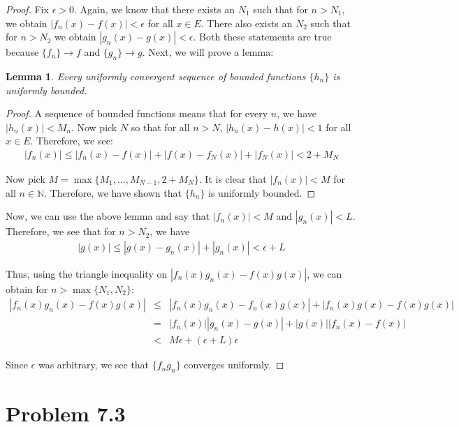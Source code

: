 \documentclass[psamsfonts]{amsart}
\newtheorem{lem}[thm]{Lemma}
\theoremstyle{definition}
\theoremstyle{remark}
\numberwithin{equation}{section}
\begin{document}
\begin{proof}
Fix $\epsilon > 0$. Again, we know that there exists an $N_1$ such that for $n > N_1$, we obtain $|f_n(x) - f(x)| < \epsilon$ for all $x \in E$. There also exists an $N_2$ such that for $n > N_2$ we obtain $|g_n(x) - g(x)| < \epsilon$. Both these statements are true because $\{ f_n \} \to f$ and $\{g_n \} \to g$. Next, we will prove a lemma:

\begin{lem}
Every uniformly convergent sequence of bounded functions $\{h_n \}$ is uniformly bounded.
\end{lem}

\begin{proof}
A sequence of bounded functions means that for every $n$, we have $|h_n(x)| < M_n$. Now pick $N$ so that for all $n > N$, $|h_n(x) - h(x)| < 1$ for all $x \in E$. Therefore, we see:
\begin{eqnarray}
|f_n(x)| \leq |f_n(x) - f(x)| + |f(x) - f_N(x)| + |f_N(x)| < 2 + M_N 
\end{eqnarray}  

Now pick $M = \max \{ M_1, \ldots, M_{N-1}, 2 + M_N \}$. It is clear that $|f_n(x)| < M$ for all $n \in \mathbb{N}$. Therefore, we have shown that $\{h_n \}$ is uniformly bounded.
\end{proof}

Now, we can use the above lemma and say that $|f_n(x)| < M$ and $|g_n(x)| < L$. Therefore, we see that for $n > N_2$, we have
\begin{eqnarray}
|g(x)| \leq |g(x) - g_n(x)| + |g_n(x)| < \epsilon + L
\end{eqnarray}

Thus, using the triangle inequality on $|f_n(x)g_n(x) - f(x) g(x)|$, we can obtain for $n > \max \{N_1, N_2 \}$:
\begin{eqnarray}
|f_n(x)g_n(x) - f(x) g(x)| &\leq& |f_n(x) g_n(x) - f_n(x) g(x)| + |f_n(x) g(x) - f(x) g(x)| \\
&=& |f_n(x)| |g_n(x) - g(x)| + |g(x)| |f_n(x) - f(x)| \\
&<& M \epsilon + (\epsilon + L) \epsilon
\end{eqnarray}

Since $\epsilon$ was arbitrary, we see that $\{ f_n g_n \}$ converges uniformly. 
\end{proof}

\section{Problem 7.3}
\end{document}
